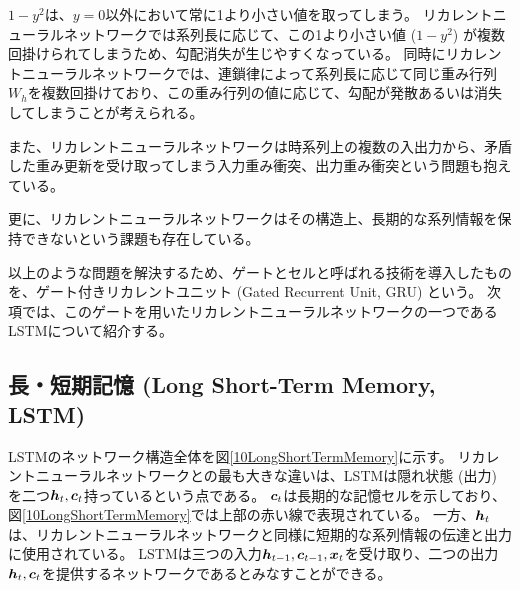 $1-y^2$は、$y=0$以外において常に1より小さい値を取ってしまう。
リカレントニューラルネットワークでは系列長に応じて、この1より小さい値 ($1-y^2$) が複数回掛けられてしまうため、勾配消失が生じやすくなっている。
同時にリカレントニューラルネットワークでは、連鎖律によって系列長に応じて同じ重み行列$W_h$を複数回掛けており、この重み行列の値に応じて、勾配が発散あるいは消失してしまうことが考えられる。

また、リカレントニューラルネットワークは時系列上の複数の入出力から、矛盾した重み更新を受け取ってしまう入力重み衝突、出力重み衝突という問題も抱えている。

更に、リカレントニューラルネットワークはその構造上、長期的な系列情報を保持できないという課題も存在している。

以上のような問題を解決するため、ゲートとセルと呼ばれる技術を導入したものを、ゲート付きリカレントユニット (Gated Recurrent Unit, GRU\cite{GRU}) という。
次項では、このゲートを用いたリカレントニューラルネットワークの一つであるLSTMについて紹介する。


\subsection{長・短期記憶 (Long Short-Term Memory, LSTM)} \label{DL:RNN:LongShortTermMemory}

LSTMのネットワーク構造全体を図\ref{10LongShortTermMemory}に示す。
リカレントニューラルネットワークとの最も大きな違いは、LSTMは隠れ状態 (出力) を二つ${\mbox{\boldmath{$h$}}}_t,{\mbox{\boldmath{$c$}}}_t$持っているという点である。
${\mbox{\boldmath{$c$}}}_t$は長期的な記憶セルを示しており、図\ref{10LongShortTermMemory}では上部の赤い線で表現されている。
一方、${\mbox{\boldmath{$h$}}}_t$は、リカレントニューラルネットワークと同様に短期的な系列情報の伝達と出力に使用されている。
LSTMは三つの入力${\mbox{\boldmath{$h$}}}_{t-1},{\mbox{\boldmath{$c$}}}_{t-1},{\mbox{\boldmath{$x$}}}_t$を受け取り、二つの出力${\mbox{\boldmath{$h$}}}_t,{\mbox{\boldmath{$c$}}}_t$を提供するネットワークであるとみなすことができる。

